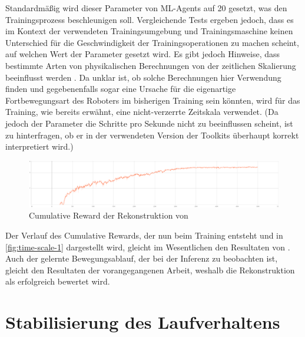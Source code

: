 Standardmäßig wird dieser Parameter von ML-Agents auf 20 gesetzt, was den Trainingsprozess beschleunigen soll.
Vergleichende Tests ergeben jedoch, dass es im Kontext der verwendeten Trainingsumgebung und Trainingsmaschine keinen Unterschied für die Geschwindigkeit der Trainingsoperationen zu machen scheint, auf welchen Wert der Parameter gesetzt wird.
Es gibt jedoch Hinweise, dass bestimmte Arten von physikalischen Berechnungen von der zeitlichen Skalierung beeinflusst werden \cite{zhang2021}.
Da unklar ist, ob solche Berechnungen hier Verwendung finden und gegebenenfalls sogar eine Ursache für die eigenartige Fortbewegungsart des Roboters im bisherigen Training sein könnten, wird für das Training, wie bereits erwähnt, eine nicht-verzerrte Zeitskala verwendet.
(Da jedoch der Parameter die Schritte pro Sekunde nicht zu beeinflussen scheint, ist zu hinterfragen, ob er in der verwendeten Version der Toolkits überhaupt korrekt interpretiert wird.)

\begin{figure}[H]
    \centering
    \includegraphics[width=\textwidth]{Bilder/ml-agents/Environment_Cumulative Reward_time-scale-1.pdf}
    \caption{Cumulative Reward der Rekonstruktion von \cite{waidner.2020}}
    \label{fig:time-scale-1}
\end{figure}

Der Verlauf des Cumulative Rewards, der nun beim Training entsteht und in \autoref{fig:time-scale-1} dargestellt wird, gleicht im Wesentlichen den Resultaten von \cite[50]{waidner.2020}.
Auch der gelernte Bewegungsablauf, der bei der Inferenz zu beobachten ist, gleicht den Resultaten der vorangegangenen Arbeit, weshalb die Rekonstruktion als erfolgreich bewertet wird.


\section{Stabilisierung des Laufverhaltens}